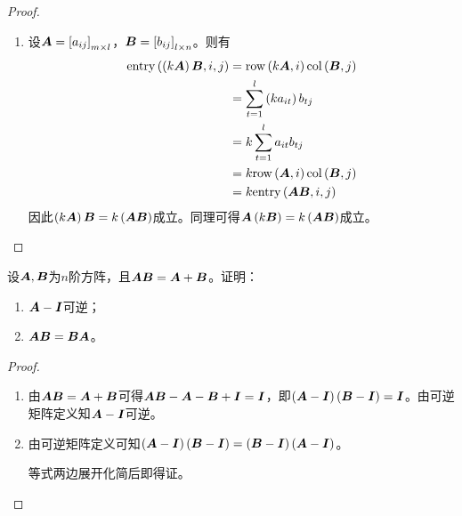 \begin{proof}
\begin{enumerate}
        \item
              {
              设\(\boldsymbol{A}=\left[ a_{ij} \right]_{m\times l}\)，\(\boldsymbol{B}=\left[ b_{ij} \right]_{l\times n}\)。则有
              \begin{align*}
                  \mathrm{entry}\left( \left( k\boldsymbol{A} \right)\boldsymbol{B},i,j \right) & =\mathrm{row}\left( k\boldsymbol{A},i \right)\mathrm{col}\left( \boldsymbol{B},j \right)    \\
                                                   & =\sum_{t=1}^l\left( ka_{it} \right)b_{tj} \\
                                                   & =k\sum_{t=1}^la_{it}b_{tj}        \\
                                                   & =k\mathrm{row}\left( \boldsymbol{A},i \right)\mathrm{col}\left( \boldsymbol{B},j \right)    \\
                                                   & =k\mathrm{entry}\left( \boldsymbol{A}\boldsymbol{B},i,j \right)
              \end{align*}
              因此\(\left( k\boldsymbol{A} \right)\boldsymbol{B}=k\left( \boldsymbol{A}\boldsymbol{B} \right)\)成立。同理可得\(\boldsymbol{A}\left( k\boldsymbol{B} \right)=k\left( \boldsymbol{A}\boldsymbol{B} \right)\)成立。
              }
    \end{enumerate}
\end{proof}

\begin{suplprob}\label{supl-1.1}
    设\(\boldsymbol{A},\boldsymbol{B}\)为\(n\)阶方阵，且\(\boldsymbol{A}\boldsymbol{B}=\boldsymbol{A}+\boldsymbol{B}\)。证明：
    \begin{enumerate}
        \item \(\boldsymbol{A}-\boldsymbol{I}\)可逆；
        \item \(\boldsymbol{A}\boldsymbol{B}=\boldsymbol{B}\boldsymbol{A}\)。
    \end{enumerate}
\end{suplprob}
\begin{proof}
    \begin{enumerate}
        \item
              {
              由\(\boldsymbol{A}\boldsymbol{B}=\boldsymbol{A}+\boldsymbol{B}\)可得\(\boldsymbol{A}\boldsymbol{B}-\boldsymbol{A}-\boldsymbol{B}+\boldsymbol{I}=\boldsymbol{I}\)，即\(\left( \boldsymbol{A}-\boldsymbol{I} \right)\left( \boldsymbol{B}-\boldsymbol{I} \right)=\boldsymbol{I}\)。由可逆矩阵定义知\(\boldsymbol{A}-\boldsymbol{I}\)可逆。
              }
        \item
              {
              由可逆矩阵定义可知\(\left( \boldsymbol{A}-\boldsymbol{I} \right)\left( \boldsymbol{B}-\boldsymbol{I} \right)=\left( \boldsymbol{B}-\boldsymbol{I} \right)\left( \boldsymbol{A}-\boldsymbol{I} \right)\)。

              等式两边展开化简后即得证。
              }
    \end{enumerate}
\end{proof}


